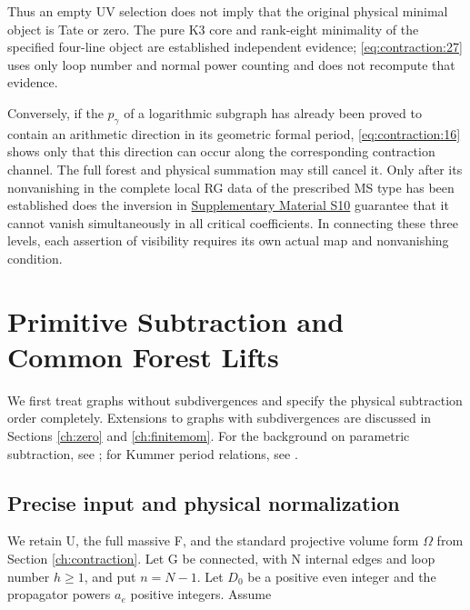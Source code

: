 \documentclass[11pt,a4paper,oneside]{article}
\theoremstyle{plain}
\theoremstyle{definition}
\theoremstyle{remark}
\numberwithin{equation}{section}
\newcommand{\otherref}[2]{\href{#1.pdf}{#2}}
\begin{document}
Thus an empty UV selection does not imply that the original physical minimal object is Tate or zero. The pure K3 core and rank-eight minimality of the specified four-line object are established independent evidence; \eqref{eq:contraction:27} uses only loop number and normal power counting and does not recompute that evidence.

Conversely, if the \(p_\gamma \) of a logarithmic subgraph has already been proved to contain an arithmetic direction in its geometric formal period, \eqref{eq:contraction:16} shows only that this direction can occur along the corresponding contraction channel. The full forest and physical summation may still cancel it. Only after its nonvanishing in the complete local RG data of the prescribed MS type has been established does the inversion in \otherref{feynman_periods_supplement_en}{Supplementary Material S10} guarantee that it cannot vanish simultaneously in all critical coefficients. In connecting these three levels, each assertion of visibility requires its own actual map and nonvanishing condition.



\endgroup




\section{Primitive Subtraction and Common Forest Lifts}\label{ch:primitive}\label{ch:forest}

\begingroup

We first treat graphs without subdivergences and specify the physical subtraction order completely. Extensions to graphs with subdivergences are discussed in Sections \ref{ch:zero} and \ref{ch:finitemom}. For the background on parametric subtraction, see \cite{bk2008}; for Kummer period relations, see \cite{brownperiods}.

\subsection{Precise input and physical normalization}\label{sec:primitive:1}

We retain U, the full massive F, and the standard projective volume form \(\Omega \) from Section \ref{ch:contraction}. Let G be connected, with N internal edges and loop number \(h\ge 1\), and put \(n=N- 1\). Let \(D_0\) be a positive even integer and the propagator powers \(a_e\) positive integers. Assume
\end{document}
